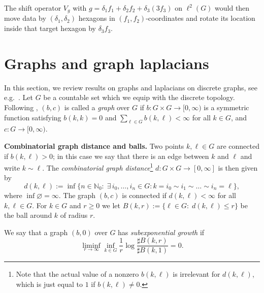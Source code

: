 \documentclass{article}
\newcommand\N{{\mathbb N}}
\numberwithin{equation}{section}   %
\numberwithin{figure}{section}  %
\begin{document}
The shift operator $V_g$ with $g=\delta_1f_1+\delta_2f_2+\delta_3 (3f_3)$ on $\ell^2(G)$ would then move data by $(\delta_1,\delta_2)$ hexagons in $(f_1,f_2)$-coordinates and rotate its location inside that target hexagon by $\delta_3 f_3$.


\section{Graphs and graph laplacians}
\label{sec:graph_laplacians}

In this section, we review results on graphs and laplacians on discrete graphs, see e.g.\ \cite{KellerLenzWojciechowskiBook}.
Let $G$ be a countable set which we equip with the discrete topology.
Following \cite[Defn.~1.1]{KellerLenzWojciechowskiBook}, $(b,c)$ is called a {\sl graph} over $G$ if $b: G\times G\to [0,\infty)$ is a symmetric function satisfying $b(k,k) = 0$ and $\sum_{\ell\in G} b(k,\ell) < \infty$ for all $k\in G$, and $c:G\to [0,\infty)$.

\textbf{Combinatorial graph distance and balls.}
Two points $k,\ell\in G$ are connected if $b(k,\ell)>0$; in this case we say that there is an edge between $k$ and $\ell$ and write $k\sim \ell$. The \emph{combinatorial graph distance}\footnote{Note that the actual value of a nonzero $b(k,\ell)$ is irrelevant for $d(k,\ell)$, which is just equal to $1$ if $b(k,\ell)\ne 0$.} $d:G\times G\to [0,\infty]$ is then given by 
\[d(k,\ell):= \inf\{n\in\N_0:\; \exists\, i_0,\ldots, i_n\in G: k=i_0\sim i_1\sim\ldots\sim i_n=\ell\},\]
where $\inf\varnothing=\infty$. The graph $(b,c)$ is connected if $d(k,\ell)<\infty$ for all $k,\ell\in G$.
For $k\in G$ and $r\geq 0$ we let $B(k,r):=\{\ell\in G:\; d(k,\ell)\leq r\}$ be the ball around $k$ of radius $r$. 

We say that a graph $(b,0)$ over $G$ has \emph{subexponential growth} if
\[\liminf_{r\to \infty} \inf_{k\in G} \frac{1}{r}\log \frac{\sharp B(k,r)}{\sharp B(k,1)} = 0.\]
\end{document}
